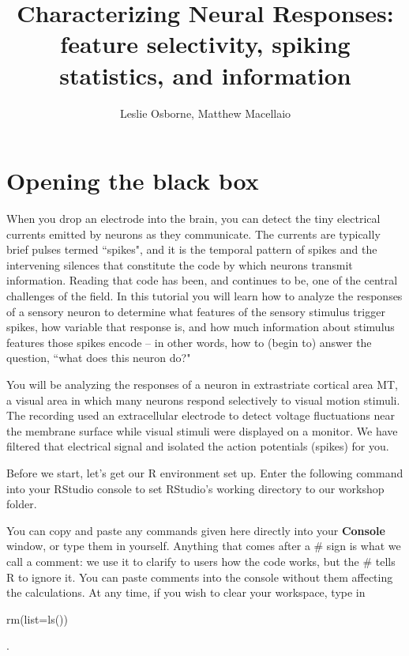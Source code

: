 \documentclass[
letterpaper, %
11pt, %
 oneside, 
onecolumn, %
]{memoir}
\author{Leslie Osborne, Matthew Macellaio}
\title{Characterizing Neural Responses: feature selectivity, spiking statistics, and information  
}
\date{}
\numberwithin{Exercise}{chapter}
\begin{document}
\frontmatter

\maketitle
\vspace{-0.5in}



\tableofcontents*


\newcommand{\R}{\texttt{R}}
\newcommand{\RS}{\texttt{RStudio}}

\chapter{Opening the black box}

When you drop an electrode into the brain, you can detect the tiny electrical currents emitted by neurons as they communicate.  The currents are typically brief pulses termed ``spikes", and it is the temporal pattern of spikes and the intervening silences that constitute the code by which neurons transmit information.   Reading that code has been, and continues to be, one of the central challenges of the field.  In this tutorial you will learn how to analyze the responses of a sensory neuron to determine what features of the sensory stimulus trigger spikes, how variable that response is, and how much information about stimulus features those spikes encode -- in other words, how to (begin to) answer the question, ``what does this neuron do?"


You will be analyzing the responses of a neuron in extrastriate cortical area MT, a visual area in which many neurons respond selectively to visual motion stimuli.   The recording used an extracellular electrode to detect voltage fluctuations near the membrane surface while visual stimuli were displayed on a monitor.   We have filtered that electrical signal and isolated the action potentials (spikes) for you. 

 
Before we start, let's get our R environment set up. Enter the following command into your RStudio console to set RStudio's working directory to our workshop folder. 

You can copy and paste any commands given here directly into your \textbf{Console} window, or type them in yourself. Anything that comes after a \# sign is what we call a comment: we use it to clarify to users how the code works, but the \# tells R to ignore it. You can paste comments into the console without them affecting the calculations.   At any time, if you wish to clear your workspace, type in \begin{ttfamily}rm(list=ls())\end{ttfamily}. 
\end{document}
